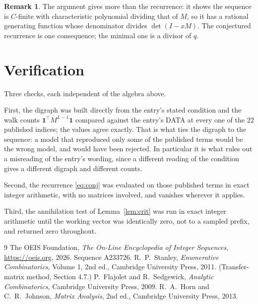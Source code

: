 \documentclass[11pt,a4paper]{article}
\theoremstyle{plain}
\theoremstyle{definition}
\newtheorem{remark}[theorem]{Remark}
\begin{document}
\begin{remark}
The argument gives more than the recurrence: it shows the sequence is $C$-finite with
characteristic polynomial dividing that of $M$, so it has a rational generating function
whose denominator divides $\det(I-xM)$. The conjectured recurrence is one consequence; the
minimal one is a divisor of $q$.
\end{remark}

\section{Verification}

Three checks, each independent of the algebra above.

First, the digraph was built directly from the entry's stated condition and the walk counts
$\mathbf{1}^{\!\top}M^{L-1}\mathbf{1}$ compared against the entry's DATA at
every one of the $22$ published indices; the values agree exactly. That is what ties
the digraph to the sequence: a model that reproduced only some of the published terms would
be the wrong model, and would have been rejected. In particular it is what rules out a
misreading of the entry's wording, since a different reading of the condition gives a
different digraph and different counts.

Second, the recurrence \eqref{eq:conj} was evaluated on those published terms in exact
integer arithmetic, with no matrices involved, and vanishes wherever it applies.

Third, the annihilation test of Lemma~\ref{lem:crit} was run in exact integer arithmetic
until the working vector was identically zero, not to a sampled prefix, and returned zero
throughout.

\begin{thebibliography}{9}
 The OEIS Foundation, \emph{The On-Line Encyclopedia of Integer
Sequences}, \url{https://oeis.org}, 2026. Sequence A233726.
 R.~P.~Stanley, \emph{Enumerative Combinatorics}, Volume 1, 2nd ed.,
Cambridge University Press, 2011. (Transfer-matrix method, Section 4.7.)
 P.~Flajolet and R.~Sedgewick, \emph{Analytic Combinatorics}, Cambridge
University Press, 2009.
 R.~A.~Horn and C.~R.~Johnson, \emph{Matrix Analysis}, 2nd ed., Cambridge
University Press, 2013.
\end{thebibliography}
\end{document}
